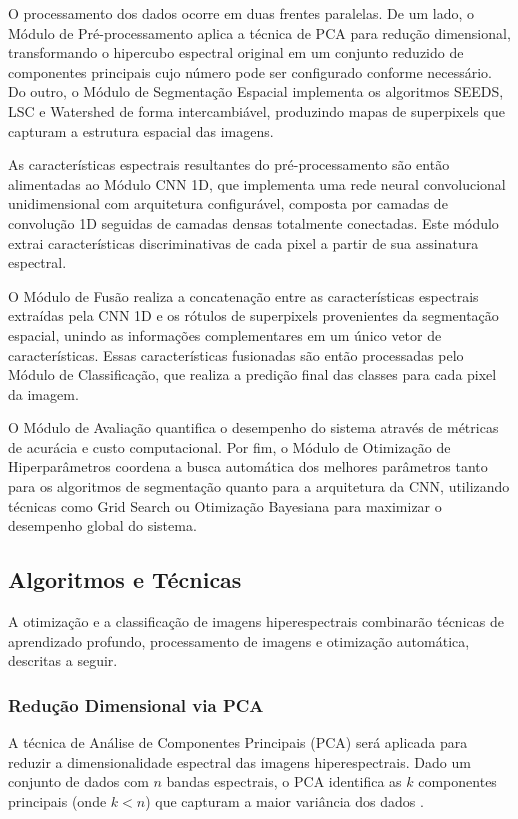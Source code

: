 O processamento dos dados ocorre em duas frentes paralelas. De um lado, o Módulo de Pré-processamento aplica a técnica de PCA para redução dimensional, transformando o hipercubo espectral original em um conjunto reduzido de componentes principais cujo número pode ser configurado conforme necessário. Do outro, o Módulo de Segmentação Espacial implementa os algoritmos SEEDS, LSC e Watershed de forma intercambiável, produzindo mapas de superpixels que capturam a estrutura espacial das imagens.

As características espectrais resultantes do pré-processamento são então alimentadas ao Módulo CNN 1D, que implementa uma rede neural convolucional unidimensional com arquitetura configurável, composta por camadas de convolução 1D seguidas de camadas densas totalmente conectadas. Este módulo extrai características discriminativas de cada pixel a partir de sua assinatura espectral.

O Módulo de Fusão realiza a concatenação entre as características espectrais extraídas pela CNN 1D e os rótulos de superpixels provenientes da segmentação espacial, unindo as informações complementares em um único vetor de características. Essas características fusionadas são então processadas pelo Módulo de Classificação, que realiza a predição final das classes para cada pixel da imagem.

O Módulo de Avaliação quantifica o desempenho do sistema através de métricas de acurácia e custo computacional. Por fim, o Módulo de Otimização de Hiperparâmetros coordena a busca automática dos melhores parâmetros tanto para os algoritmos de segmentação quanto para a arquitetura da CNN, utilizando técnicas como Grid Search ou Otimização Bayesiana para maximizar o desempenho global do sistema.

\subsection{Algoritmos e Técnicas} 
\label{subsec:algoritmos}

A otimização e a classificação de imagens hiperespectrais combinarão técnicas de aprendizado profundo, processamento de imagens e otimização automática, descritas a seguir.

\subsubsection{Redução Dimensional via PCA}

A técnica de Análise de Componentes Principais (PCA) será aplicada para reduzir a dimensionalidade espectral das imagens hiperespectrais. Dado um conjunto de dados com $n$ bandas espectrais, o PCA identifica as $k$ componentes principais (onde $k < n$) que capturam a maior variância dos dados \cite{Jolliffe2002}.

